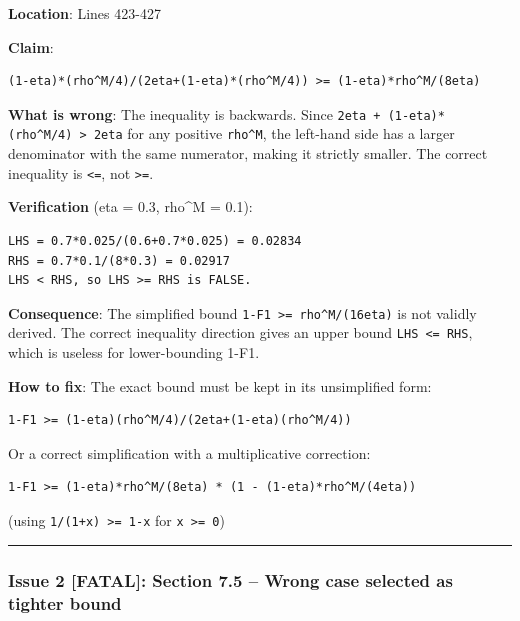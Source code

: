 \documentclass[
  12pt,
]{ctexart}
\begin{document}
\textbf{Location}: Lines 423-427

\textbf{Claim}:

\begin{verbatim}
(1-eta)*(rho^M/4)/(2eta+(1-eta)*(rho^M/4)) >= (1-eta)*rho^M/(8eta)
\end{verbatim}

\textbf{What is wrong}: The inequality is backwards. Since
\texttt{2eta\ +\ (1-eta)*(rho\^{}M/4)\ \textgreater{}\ 2eta} for any
positive \texttt{rho\^{}M}, the left-hand side has a larger denominator
with the same numerator, making it strictly smaller. The correct
inequality is \texttt{\textless{}=}, not \texttt{\textgreater{}=}.

\textbf{Verification} (eta = 0.3, rho\^{}M = 0.1):

\begin{verbatim}
LHS = 0.7*0.025/(0.6+0.7*0.025) = 0.02834
RHS = 0.7*0.1/(8*0.3) = 0.02917
LHS < RHS, so LHS >= RHS is FALSE.
\end{verbatim}

\textbf{Consequence}: The simplified bound
\texttt{1-F1\ \textgreater{}=\ rho\^{}M/(16eta)} is not validly derived.
The correct inequality direction gives an upper bound
\texttt{LHS\ \textless{}=\ RHS}, which is useless for lower-bounding
1-F1.

\textbf{How to fix}: The exact bound must be kept in its unsimplified
form:

\begin{verbatim}
1-F1 >= (1-eta)(rho^M/4)/(2eta+(1-eta)(rho^M/4))
\end{verbatim}

Or a correct simplification with a multiplicative correction:

\begin{verbatim}
1-F1 >= (1-eta)*rho^M/(8eta) * (1 - (1-eta)*rho^M/(4eta))
\end{verbatim}

(using \texttt{1/(1+x)\ \textgreater{}=\ 1-x} for
\texttt{x\ \textgreater{}=\ 0})

\begin{center}\rule{0.5\linewidth}{0.5pt}\end{center}

\subsubsection{Issue 2 {[}FATAL{]}: Section 7.5 -- Wrong case selected
as tighter
bound}\label{issue-2-fatal-section-7.5-wrong-case-selected-as-tighter-bound}
\end{document}
